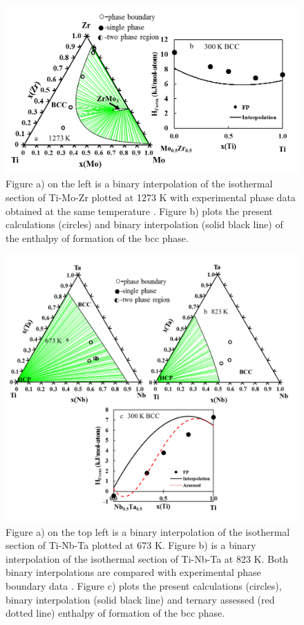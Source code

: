 \newpage
\begin{figure}[H]
	\centering
	\includegraphics[width=\textwidth]{Chapter-3/Figures/TiMoZr.png}
	\caption{Figure a) on the left is a binary interpolation of the isothermal section of Ti-Mo-Zr plotted at 1273 K with experimental phase data obtained at the same temperature \cite{Kar2008,Prokoshkin1967}. Figure b) plots the present calculations (circles) and binary interpolation (solid black line) of the enthalpy of formation of the bcc phase.}
	\label{Ch3-figure:TiMoZr}
\end{figure}

\newpage
\begin{figure}[H]
	\centering
	\includegraphics[width=\textwidth]{Chapter-3/Figures/TiNbTa1.png}
	\caption{Figure a) on the top left is a binary interpolation of the isothermal section of Ti-Nb-Ta plotted at 673 K. Figure b) is a binary interpolation of the isothermal section of Ti-Nb-Ta at 823 K. Both binary interpolations are compared with experimental phase boundary data \cite{Na2001}. Figure c) plots the present calculations (circles), binary interpolation (solid black line) and ternary assessed (red dotted line) enthalpy of formation of the bcc phase.}
	\label{Ch3-figure:TiNbTa1}
\end{figure}

